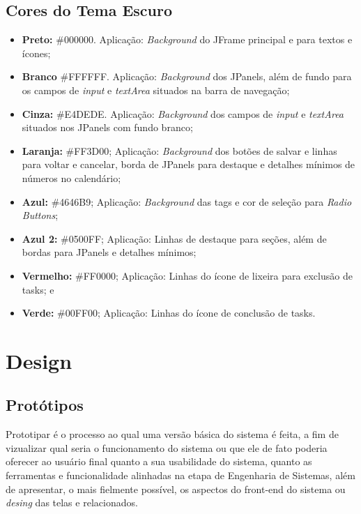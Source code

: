 \documentclass[a4paper,12pt]{article}
\begin{document}
\subsection{Cores do Tema Escuro}
\begin{itemize}
	\item \textbf{Preto:} \#000000. Aplicação: \textit{Background} do JFrame principal e para textos e ícones;
	\item \textbf{Branco} \#FFFFFF. Aplicação: \textit{Background} dos JPanels, além de fundo para os campos de \textit{input} e \textit{textArea} 
	situados na barra de navegação;
	\item \textbf{Cinza:} \#E4DEDE. Aplicação: \textit{Background} dos campos de \textit{input} e \textit{textArea} situados nos JPanels com fundo branco;
	\item \textbf{Laranja:} \#FF3D00; Aplicação: \textit{Background} dos botões de salvar e linhas para voltar e cancelar, borda de JPanels para 
	destaque e detalhes mínimos de números no calendário;
	\item \textbf{Azul:} \#4646B9; Aplicação: \textit{Background} das tags e cor de seleção para \textit{Radio Buttons};
	\item \textbf{Azul 2:} \#0500FF; Aplicação: Linhas de destaque para seções, além de bordas para JPanels e detalhes mínimos;
	\item \textbf{Vermelho:} \#FF0000; Aplicação: Linhas do ícone de lixeira para exclusão de tasks; e
	\item \textbf{Verde:} \#00FF00; Aplicação: Linhas do ícone de conclusão de tasks.
	
\end{itemize}

\pagebreak
\section{Design}
\subsection{Protótipos}
Prototipar é o processo ao qual uma versão básica do sistema é feita, a fim de vizualizar qual seria o funcionamento do sistema ou que 
ele de fato poderia oferecer ao usuário final quanto a sua usabilidade do sistema, quanto as ferramentas e funcionalidade alinhadas 
na etapa de Engenharia de Sistemas, além de apresentar, o mais fielmente possível, os aspectos do front-end do sistema 
ou \textit{desing} das telas e relacionados.
\end{document}
